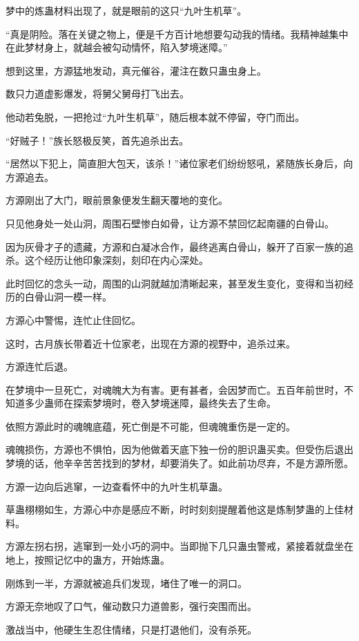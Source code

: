 \begin{this_body}
梦中的炼蛊材料出现了，就是眼前的这只“九叶生机草”。

“真是阴险。落在关键之物上，便是千方百计地想要勾动我的情绪。我精神越集中在此梦材身上，就越会被勾动情怀，陷入梦境迷障。”

想到这里，方源猛地发动，真元催谷，灌注在数只蛊虫身上。

数只力道虚影爆发，将舅父舅母打飞出去。

他动若兔脱，一把抢过“九叶生机草”，随后根本就不停留，夺门而出。

“好贼子！”族长怒极反笑，首先追杀出去。

“居然以下犯上，简直胆大包天，该杀！”诸位家老们纷纷怒吼，紧随族长身后，向方源追去。

方源刚出了大门，眼前景象便发生翻天覆地的变化。

只见他身处一处山洞，周围石壁惨白如骨，让方源不禁回忆起南疆的白骨山。

因为灰骨才子的遗藏，方源和白凝冰合作，最终逃离白骨山，躲开了百家一族的追杀。这个经历让他印象深刻，刻印在内心深处。

此时回忆的念头一动，周围的山洞就越加清晰起来，甚至发生变化，变得和当初经历的白骨山洞一模一样。

方源心中警惕，连忙止住回忆。

这时，古月族长带着近十位家老，出现在方源的视野中，追杀过来。

方源连忙后退。

在梦境中一旦死亡，对魂魄大为有害。更有甚者，会因梦而亡。五百年前世时，不知道多少蛊师在探索梦境时，卷入梦境迷障，最终失去了生命。

依照方源此时的魂魄底蕴，死亡倒是不可能，但魂魄重伤是一定的。

魂魄损伤，方源也不惧怕，因为他做着天底下独一份的胆识蛊买卖。但受伤后退出梦境的话，他辛辛苦苦找到的梦材，却要消失了。如此前功尽弃，不是方源所愿。

方源一边向后逃窜，一边查看怀中的九叶生机草蛊。

草蛊栩栩如生，方源心中亦是感应不断，时时刻刻提醒着他这是炼制梦蛊的上佳材料。

方源左拐右拐，逃窜到一处小巧的洞中。当即抛下几只蛊虫警戒，紧接着就盘坐在地上，按照记忆中的蛊方，开始炼蛊。

刚炼到一半，方源就被追兵们发现，堵住了唯一的洞口。

方源无奈地叹了口气，催动数只力道兽影，强行突围而出。

激战当中，他硬生生忍住情绪，只是打退他们，没有杀死。


\end{this_body}
